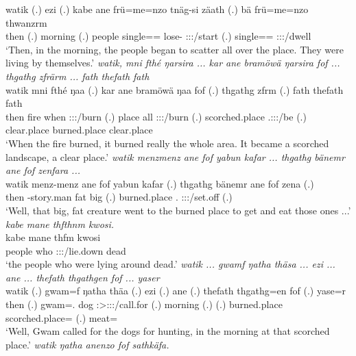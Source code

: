 \begin{exe}
	\gll watik (.) ezi (.) kabe ane frü=me=nzo tnäg-si zäath (.) bä frü=me=nzo thwanzrm\\ 
	then (.) morning (.) people {\Dem} single=\Ins={\Only} lose-{\Nmlz} \Stpl:\Sbj:\Pst:\Pfv/start (.) \Med{} single=\Ins={\Only} \Stpl:\Sbj:\Pst:\Dur/dwell\\
	\trans `Then, in the morning, the people began to scatter all over the place. They were living by themselves.'
	\emph{watik, mni fthé ŋarsira ... kar ane bramöwä ŋarsira fof ... thgathg zfrärm ... fath thefath fath}\\
	\gll watik mni fthé ŋaa (.) kar ane bramöwä ŋaa fof (.) thgathg zfrm (.) fath thefath fath\\ 
	then fire when \Sg:\Sbj:\Pst:\Ipfv/burn (.) place {\Dem} all \Sg:\Sbj:\Pst:\Ipfv/burn {\Emph} (.) scorched.place \Tsg.\F:\Sbj:\Pst:\Dur/be (.) clear.place burned.place clear.place\\
	\trans `When the fire burned, it burned really the whole area. It became a scorched landscape, a clear place.'
	\emph{watik menzmenz ane fof yabun kafar ... thgathg bänemr ane fof zenfara ...}\\
	\gll watik menz-menz ane fof yabun kafar (.) thgathg bänemr ane fof zena (.)\\ 
	then \Redup-story.man {\Dem} {\Emph} fat big (.) burned.place \Recog.{\Purp} {\Dem} {\Emph} \Sg:\Sbj:\Pst:\Pfv/set.off (.)\\
	\trans `Well, that big, fat creature went to the burned place to get and eat those ones ...'
	\emph{kabe mane thfthnm kwosi.}\\
	\gll kabe mane thfm kwosi\\ 
	people who \Stpl:\Sbj:\Pst:\Dur/lie.down dead\\
	\trans `the people who were lying around dead.'
	\emph{watik ... gwamf ŋatha thäsa ... ezi ... ane ... thefath thgathgen fof ... yaser}\\
	\gll watik (.) gwam=f ŋatha thäa (.) ezi (.) ane (.) thefath thgathg=en fof (.) yase=r\\ 
	then (.) gwam=\Erg.{\Sg} dog \Sg:\Sbj>\Stpl:\Obj:\Pst:\Ipfv/call.for (.) morning (.) {\Dem} (.) burned.place scorched.place={\Loc} {\Emph} (.) meat=\Purp \\
	\trans `Well, Gwam called for the dogs for hunting, in the morning at that scorched place.'
	\emph{watik ŋatha anenzo fof sathkäfa.}\\

\end{exe}
